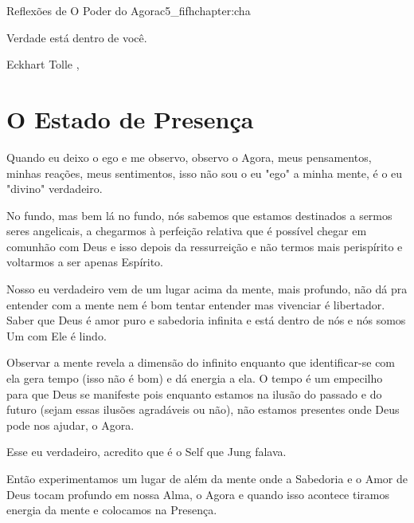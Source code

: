 \begin{chapterpage}{Reflexões de O Poder do Agora}{c5_fifhchapter:cha}

\begin{myquotation} Verdade está dentro de você. 
\par\vspace*{15mm}
\mbox{}\hfill \emdash{}Eckhart Tolle 
, %
\par\end{myquotation}

\end{chapterpage}



\section{O Estado de Presença}\label{c1_basicformatting:sec}

\emdash{}Quando eu deixo o ego e me observo, observo o Agora, meus pensamentos, minhas reações, meus sentimentos, isso não sou o eu "ego" a minha mente, é o eu "divino" verdadeiro. 

No fundo, mas bem lá no fundo, nós sabemos que estamos destinados a sermos seres angelicais, a chegarmos à perfeição relativa que é possível chegar em comunhão com Deus e isso depois da ressurreição e não termos mais perispírito e voltarmos a ser apenas Espírito. 

Nosso eu verdadeiro vem de um lugar acima da mente, mais profundo, não dá pra entender com a mente nem é bom tentar entender mas vivenciar é libertador. Saber que Deus é amor puro e sabedoria infinita e está dentro de nós e nós somos Um com Ele é lindo. 

Observar a mente revela a dimensão do infinito enquanto que identificar-se com ela gera tempo (isso não é bom) e dá energia a ela. O tempo é um empecilho para que Deus se manifeste pois enquanto estamos na ilusão do passado e do futuro (sejam essas ilusões agradáveis ou não), não estamos presentes onde Deus pode nos ajudar, o Agora. 

Esse eu verdadeiro, acredito que é o Self que Jung falava. 


Então experimentamos um lugar de além da mente onde a Sabedoria e o Amor de Deus tocam profundo em nossa Alma, o Agora e quando isso acontece tiramos energia da mente e colocamos na Presença. 

